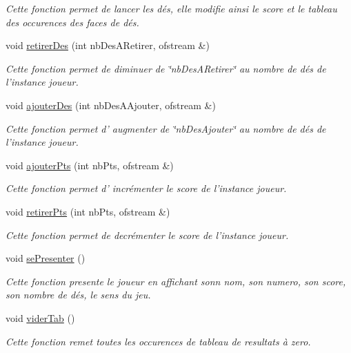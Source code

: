 \begin{DoxyCompactItemize}
\begin{DoxyCompactList}\small\item\em \-Cette fonction permet de lancer les dés, elle modifie ainsi le score et le tableau des occurences des faces de dés. \end{DoxyCompactList}\item 
void \hyperlink{class_joueur_a72f632a1de976ad4e0a22f51f0b20771}{retirer\-Des} (int nb\-Des\-A\-Retirer, ofstream \&)
\begin{DoxyCompactList}\small\item\em \-Cette fonction permet de diminuer de \char`\"{}nb\-Des\-A\-Retirer\char`\"{} au nombre de dés de l'instance joueur. \end{DoxyCompactList}\item 
void \hyperlink{class_joueur_a068e2f9461a02bff06d4194fcd412c8b}{ajouter\-Des} (int nb\-Des\-A\-Ajouter, ofstream \&)
\begin{DoxyCompactList}\small\item\em \-Cette fonction permet d' augmenter de \char`\"{}nb\-Des\-Ajouter\char`\"{} au nombre de dés de l'instance joueur. \end{DoxyCompactList}\item 
void \hyperlink{class_joueur_adbc9cb842737c6bc0b59efc28727654d}{ajouter\-Pts} (int nb\-Pts, ofstream \&)
\begin{DoxyCompactList}\small\item\em \-Cette fonction permet d' incrémenter le score de l'instance joueur. \end{DoxyCompactList}\item 
void \hyperlink{class_joueur_a693d4e88b0461900258ffb5aab3f7668}{retirer\-Pts} (int nb\-Pts, ofstream \&)
\begin{DoxyCompactList}\small\item\em \-Cette fonction permet de decrémenter le score de l'instance joueur. \end{DoxyCompactList}\item 
\hypertarget{class_joueur_a41a37a9c90b06841390352b1e97bf4fc}{void \hyperlink{class_joueur_a41a37a9c90b06841390352b1e97bf4fc}{se\-Presenter} ()}\label{class_joueur_a41a37a9c90b06841390352b1e97bf4fc}

\begin{DoxyCompactList}\small\item\em \-Cette fonction presente le joueur en affichant sonn nom, son numero, son score, son nombre de dés, le sens du jeu. \end{DoxyCompactList}\item 
\hypertarget{class_joueur_a807b313956e560367bbd44ecfeafff4c}{void \hyperlink{class_joueur_a807b313956e560367bbd44ecfeafff4c}{vider\-Tab} ()}\label{class_joueur_a807b313956e560367bbd44ecfeafff4c}

\begin{DoxyCompactList}\small\item\em \-Cette fonction remet toutes les occurences de tableau de resultats à zero. \end{DoxyCompactList}\end{DoxyCompactItemize}


